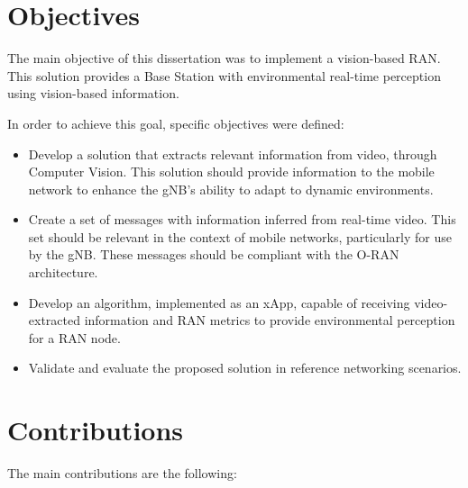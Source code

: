 \section{Objectives}\label{sec:objectives}

The main objective of this dissertation was to implement a vision-based RAN. This solution provides a Base Station with environmental real-time perception using vision-based information.

In order to achieve this goal, specific objectives were defined:

    \begin{itemize}
    
    \item Develop a solution that extracts relevant information from video, through Computer Vision.
    This solution should provide information to the mobile network to enhance the gNB's ability to adapt to dynamic environments.
    
    \item Create a set of messages with information inferred from real-time video.
    This set should be relevant in the context of mobile networks, particularly for use by the gNB\@.
    These messages should be compliant with the O-RAN architecture.
    
    \item Develop an algorithm, implemented as an xApp, capable of receiving video-extracted information and RAN metrics to provide environmental perception for a RAN node.
      
    \item Validate and evaluate the proposed solution in reference networking scenarios.
    
    \end{itemize}

\section{Contributions}\label{sec:contributions}

The main contributions are the following:

